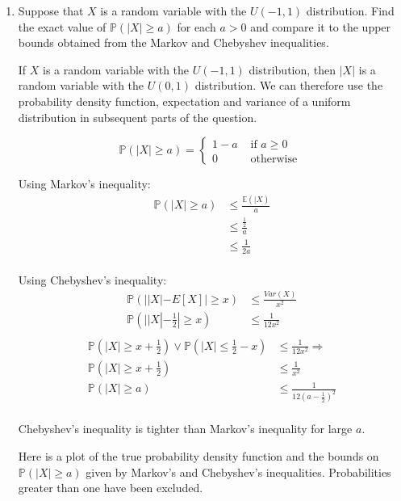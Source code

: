 \documentclass[10pt,\jkfside,a4paper]{article}
\begin{document}
\begin{enumerate}

\item

Suppose that $X$ is a random variable with the $U(-1, 1)$ distribution.
Find the exact value of $\mathbb{P}(|X| \geq a)$ for each $a > 0$ and
compare it to the upper bounds obtained from the Markov and Chebyshev inequalities.

If $X$ is a random variable with the $U(-1, 1)$ distribution, then $|X|$ is a random variable with the $U(0, 1)$
distribution. We can therefore use the probability density function, expectation and variance of a uniform
distribution in subsequent parts of the question.

\[
\mathbb{P}(|X| \geq a) =
\begin{cases}
1 - a & \text{ if } a \geq 0 \\
0 & \text{ otherwise }
\end{cases}
\]

Using Markov's inequality:
\[
\begin{split}
\mathbb{P}(|X| \geq a) &\leq \frac{\mathbb{E}(|X)}{a} \\
&\leq \frac{\frac{1}{2}}{a} \\
&\leq \frac{1}{2a} \\
\end{split}
\]

Using Chebyshev's inequality:
\[
\begin{split}
\mathbb{P}(||X| - E[X]| \geq x) &\leq \frac{Var(X)}{x^2} \\
\mathbb{P}\left(||X| - \frac{1}{2}| \geq x\right) &\leq \frac{1}{12x^2} \\
\end{split}
\]
\[
\begin{split}
\mathbb{P}\left(|X| \geq x + \frac{1}{2}\right) \vee \mathbb{P}\left( |X| \leq \frac{1}{2} - x \right) &\leq
\frac{1}{12x^2} \Longrightarrow \\
\mathbb{P}\left( |X| \geq x + \frac{1}{2} \right) &\leq \frac{1}{x^2} \\
\mathbb{P}(|X| \geq a) &\leq \frac{1}{12\left(a - \frac{1}{2}\right)^2} \\
\end{split}
\]

Chebyshev's inequality is tighter than Markov's inequality for large $a$.

Here is a plot of the true probability density function and the bounds on $\mathbb{P}(|X| \geq a)$ given by
Markov's and Chebyshev's inequalities. Probabilities greater than one have been excluded.


\end{enumerate}
\end{document}

